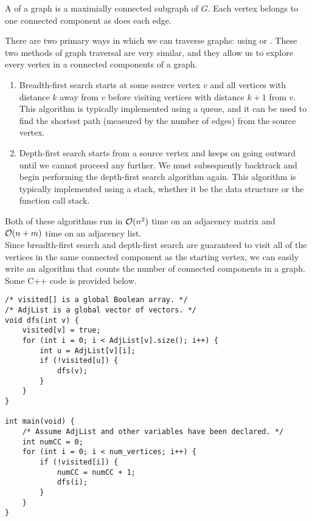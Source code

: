 \begin{definition}
A  of a graph is a maximially connected subgraph of $G$. Each vertex belongs to one connected component as does each edge.
\end{definition}

There are two primary ways in which we can traverse graphs: using  or . These two methods of graph traversal are very similar, and they allow us to explore every vertex in a connected components of a graph. 


\begin{enumerate}
    \item Breadth-first search starts at some source vertex $v$ and all vertices with distance $k$ away from $v$ before visiting vertices with distance $k + 1$ from $v$. This algorithm is typically implemented using a queue, and it can be used to find the shortest path (measured by the number of edges) from the source vertex.
    \item Depth-first search starts from a source vertex and keeps on going outward until we cannot proceed any further. We must subsequently backtrack and begin performing the depth-first search algorithm again.  This algorithm is typically implemented using a stack, whether it be the data structure or the function call stack.
\end{enumerate}

Both of these algorithms run in $\mathcal{O}(n^2)$ time on an adjacency matrix and $\mathcal{O}(n + m)$ time on an adjacency list. \\

Since breadth-first search and depth-first search are guaranteed to visit all of the vertices in the same connected component as the starting vertex, we can easily write an algorithm that counts the number of connected components in a graph. \\

Some C++ code is provided below.

\begin{lstlisting}
/* visited[] is a global Boolean array. */
/* AdjList is a global vector of vectors. */
void dfs(int v) {
    visited[v] = true;
    for (int i = 0; i < AdjList[v].size(); i++) {
        int u = AdjList[v][i];
        if (!visited[u]) {
            dfs(v);
        }
    }
}

int main(void) {
    /* Assume AdjList and other variables have been declared. */
    int numCC = 0;
    for (int i = 0; i < num_vertices; i++) {
        if (!visited[i]) {
            numCC = numCC + 1;
            dfs(i);
        }
    }
}
\end{lstlisting}